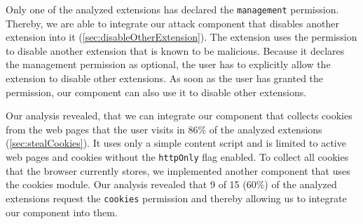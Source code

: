 	Only one of the analyzed extensions has declared the \texttt{management} permission. Thereby, we are able to integrate our attack component that disables another extension into it (\autoref{sec:disableOtherExtension}). The extension uses the permission to disable another extension that is known to be malicious. Because it declares the management permission as optional, the user has to explicitly allow the extension to disable other extensions. As soon as the user has granted the permission, our component can also use it to disable other extensions. %

	Our analysis revealed, that we can integrate our component that collects cookies from the web pages that the user visits in 86\% of the analyzed extensions (\autoref{sec:stealCookies}). It uses only a simple content script and is limited to active web pages and cookies without the \texttt{httpOnly} flag enabled. To collect all cookies that the browser currently stores, we implemented another component that uses the cookies module. Our analysis revealed that 9 of 15 (60\%) of the analyzed extensions request the \texttt{cookies} permission and thereby allowing us to integrate our component into them. 
	
